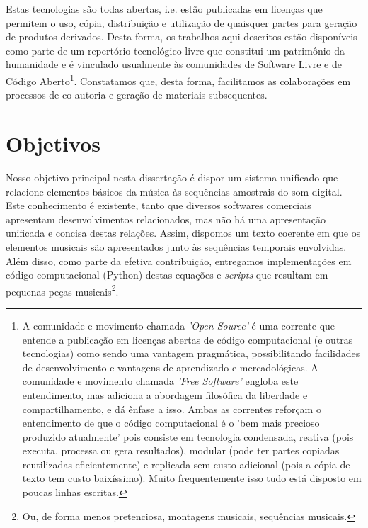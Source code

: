 Estas tecnologias são todas abertas, i.e. estão publicadas em licenças que permitem o uso, cópia, distribuição e utilização de quaisquer partes para geração de produtos derivados. Desta forma, os trabalhos aqui descritos estão disponíveis como parte de um repertório tecnológico livre que constitui um patrimônio da humanidade e é vinculado usualmente às comunidades de Software Livre e de Código Aberto\footnote{A comunidade e movimento chamada \emph{'Open Source'} é uma corrente que entende a publicação em licenças abertas de código computacional (e outras tecnologias) como sendo uma vantagem pragmática, possibilitando facilidades de desenvolvimento e vantagens de aprendizado e mercadológicas. A comunidade e movimento chamada \emph{'Free Software'} engloba este entendimento, mas adiciona a abordagem filosófica da liberdade e compartilhamento, e dá ênfase a isso. Ambas as correntes reforçam o entendimento de que o código computacional é o 'bem mais  precioso produzido atualmente' pois consiste em tecnologia condensada, reativa (pois executa, processa ou gera resultados), modular (pode ter partes copiadas reutilizadas eficientemente) e replicada sem custo adicional (pois a cópia de texto tem custo baixíssimo). Muito frequentemente isso tudo está disposto em poucas linhas escritas.}. Constatamos que, desta forma, facilitamos as colaborações em processos de co-autoria e geração de materiais subsequentes.

    \section{Objetivos}
   \label{sec:objetivos}
Nosso objetivo principal nesta dissertação é dispor um sistema unificado que relacione elementos básicos da música às sequências amostrais do som digital. Este conhecimento é existente, tanto que diversos softwares comerciais apresentam desenvolvimentos relacionados, mas não há uma apresentação unificada e concisa destas relações. Assim, dispomos um texto coerente em que os elementos musicais são apresentados junto às sequências temporais envolvidas. Além disso, como parte da efetiva contribuição, entregamos implementações em código computacional (Python) destas equações e \emph{scripts} que resultam em pequenas peças musicais\footnote{Ou, de forma menos pretenciosa, montagens musicais, sequências musicais.}. 

